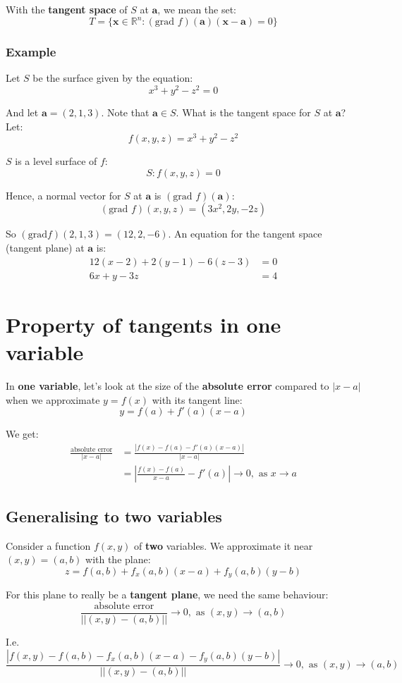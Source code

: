 \documentclass[11pt]{article}
\begin{document}
With the \textbf{tangent space} of \(S\) at \(\boldsymbol{a}\), we mean the set:
\[T = \{\boldsymbol{x} \in \mathbb{R}^n : (\text{grad } f)(\boldsymbol{a})(\boldsymbol{x} - \boldsymbol{a}) = 0\}\]

\subsubsection{Example}
\label{sec:org434baee}
Let \(S\) be the surface given by the equation:
\[x^3 + y^2 - z^2 = 0\]

And let \(\boldsymbol{a} = (2, 1, 3)\). Note that \(\boldsymbol{a} \in S\). What is the tangent space for \(S\) at \(\boldsymbol{a}\)?
\\[0pt]

Let:
\[f(x, y, z) = x^3 + y^2 - z^2\]

\(S\) is a level surface of \(f\):
\[S: f(x, y, z) = 0\]

Hence, a normal vector for \(S\) at \(\boldsymbol{a}\) is \((\text{grad } f)(\boldsymbol{a})\):
\[(\text{grad } f)(x, y, z) = (3x^2, 2y, -2z)\]

So \((\text{grad} f)(2, 1, 3) = (12, 2, -6)\). An equation for the tangent space (tangent plane) at \(\boldsymbol{a}\) is:
\begin{align*}
12(x - 2) + 2(y - 1) - 6(z - 3) &= 0 \\
6x + y - 3z &= 4
\end{align*}


\section{Property of tangents in one variable}
\label{sec:orgc830cfa}
In \textbf{one variable}, let's look at the size of the \textbf{absolute error} compared to \(|x - a|\) when we approximate \(y = f(x)\) with its tangent line:
\[y = f(a) + f'(a)(x - a)\]

We get:
\begin{align*}
\frac{\text{absolute error}}{|x - a|} &= \frac{|f(x) - f(a) - f'(a) (x - a)|}{|x - a|} \\
&= \left| \frac{f(x) - f(a)}{x - a} - f'(a) \right| \rightarrow 0, \text{ as } x \rightarrow a
\end{align*}

\subsection{Generalising to two variables}
\label{sec:orgdaa0878}
Consider a function \(f(x, y)\) of \textbf{two} variables. We approximate it near \((x, y) = (a, b)\) with the plane:
\[z = f(a, b) + f_x(a, b) (x - a) + f_y (a, b) (y - b)\]

For this plane to really be a \textbf{tangent plane}, we need the same behaviour:
\[\frac{\text{absolute error}}{||(x, y) - (a, b)||} \rightarrow 0, \text{ as } (x, y) \rightarrow (a, b)\]

I.e.
\[\frac{|f(x, y) - f(a, b) - f_x(a, b) (x - a) - f_y(a, b) (y - b)|}{||(x, y) - (a, b)||} \rightarrow 0, \text{ as } (x, y) \rightarrow (a, b)\]
\end{document}
